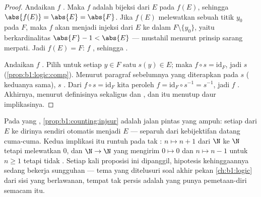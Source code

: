\begin{proof}
Andaikan $f$ . Maka $f$ adalah bijeksi dari $E$ pada $f(E)$,
sehingga $\abs{f(E)} = \abs{E} = \abs{F}$. Jika $f(E)$ melewatkan sebuah titik $y_0$ pada
$F$, maka $f$ akan menjadi injeksi dari $E$ ke dalam $F \setminus \{y_0\}$,
yaitu  berkardinalitas $\abs{F} - 1 < \abs{E}$ --- mustahil menurut
prinsip sarang merpati. Jadi $f(E) = F$: $f$ , sehingga
.

Andaikan $f$ . Pilih untuk setiap $y \in F$ satu  $s(y)
\in E$; maka $f \circ s = \mathrm{id}_F$, jadi $s$ 
(\cref{prop:b1:logic:comp}). Menurut paragraf sebelumnya yang diterapkan pada $s$
( keduanya sama), $s$ . Dari $f \circ s =
\mathrm{id}_F$ kita peroleh $f = \mathrm{id}_F \circ s^{-1} = s^{-1}$, jadi
$f$ . Akhirnya,   menurut definisinya sekaligus
 dan , dan itu menutup daur implikasinya.
\end{proof}

\begin{example}\label{ex:b1:counting:finiteonly}
Pada  yang \emph{}, \cref{prop:b1:counting:injsur} adalah
jalan pintas yang ampuh: setiap   dari $E$ ke dirinya sendiri
otomatis menjadi  $E$ --- separuh dari kebijektifan datang cuma-cuma.
Kedua implikasi itu runtuh pada  tak : $n \mapsto n + 1$
 dari $\N$ ke $\N$ tetapi melewatkan $0$, dan  $\N \to \N$
yang mengirim $0 \mapsto 0$ dan $n \mapsto n - 1$ untuk $n \geq 1$
 tetapi tidak . Setiap kali proposisi ini dipanggil,
hipotesis kehinggaannya sedang bekerja sungguhan --- tema yang ditelusuri
soal akhir pekan \cref{ch:b1:logic} dari sisi yang berlawanan,
tempat  tak  persis adalah  yang punya pemetaan-diri semacam itu.
\end{example}

